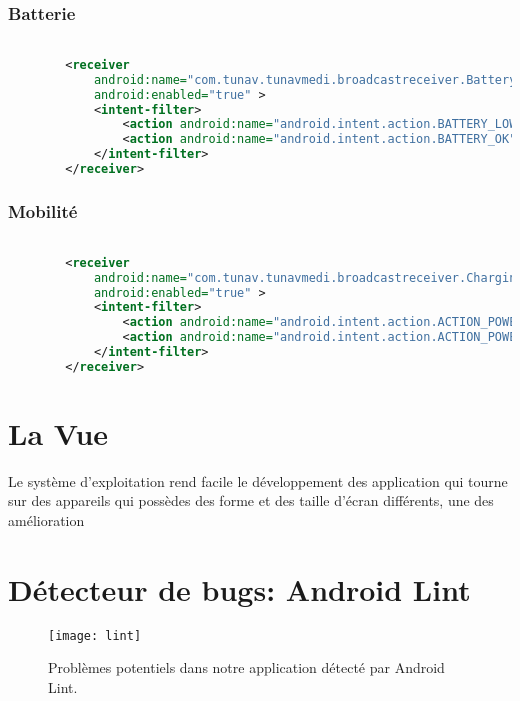 \subsubsection{Batterie}

\begin{lstlisting}[language=xml, caption=Enregistrement du BatteryReceiver aux événements liée à l’état de la batterie.]

        <receiver
            android:name="com.tunav.tunavmedi.broadcastreceiver.BatteryReceiver"
            android:enabled="true" >
            <intent-filter>
                <action android:name="android.intent.action.BATTERY_LOW" />
                <action android:name="android.intent.action.BATTERY_OK" />
            </intent-filter>
        </receiver>

\end{lstlisting}



\subsubsection{Mobilité}

\begin{lstlisting}[language=xml, caption=Enregistrement du ChargingReceiver aux événements liée au status de chargement.]

        <receiver
            android:name="com.tunav.tunavmedi.broadcastreceiver.ChargingReceiver"
            android:enabled="true" >
            <intent-filter>
                <action android:name="android.intent.action.ACTION_POWER_CONNECTED" />
                <action android:name="android.intent.action.ACTION_POWER_DISCONNECTED" />
            </intent-filter>
        </receiver>

\end{lstlisting}

\section{La Vue}
Le système d'exploitation \android{} rend facile le développement des application qui tourne sur des appareils qui possèdes des forme et des taille d’écran différents, une des amélioration

\section{Détecteur de bugs: Android Lint}

\begin{figure}[H]
\center
\texttt{[image: lint]}
\caption{Problèmes potentiels dans notre application détecté par Android Lint.}
\label{fig:lint}
\end{figure}

